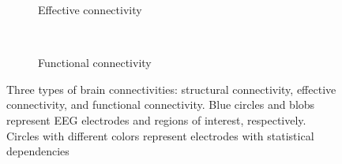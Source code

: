 \begin{figure}[h]
\begin{subfigure}[b]{.3\linewidth}
        \caption{Effective connectivity\label{fig:EC}}
    \end{subfigure}
    ~
    \begin{subfigure}[b]{.3\linewidth}
        \centering
        \caption{Functional connectivity\label{fig:FC}}
    \end{subfigure}
    \caption{Three types of brain connectivities: structural connectivity, effective connectivity, and functional connectivity. Blue circles and blobs represent EEG electrodes and regions of interest, respectively. Circles with different colors represent electrodes with statistical dependencies \label{fig:FC_EC_SC}}
\end{figure}

